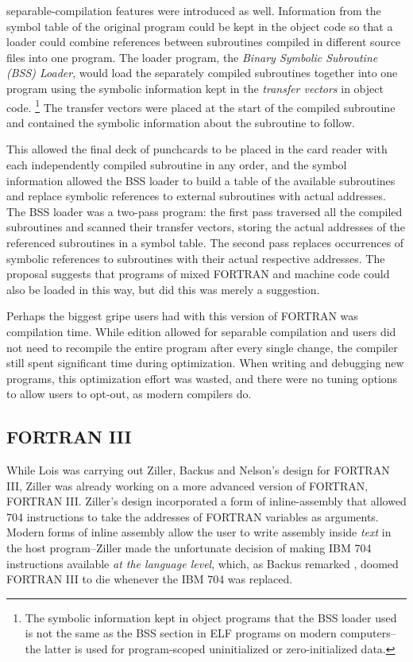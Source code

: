 \Gls{separable-compilation} features were introduced as well.
Information from the symbol table of the original program could be kept
in the object code so that a loader could combine references between subroutines
compiled in different source files into one program.
The loader program, the \textit{Binary Symbolic Subroutine (BSS) Loader},
would load the separately compiled subroutines together into one program using
the symbolic information kept in the \textit{transfer vectors} in object code.
\footnote{The symbolic information kept in object programs that the BSS loader
	used is not the same as the BSS section in ELF programs on modern computers--
	the latter is used for program-scoped uninitialized or zero-initialized data.}
The transfer vectors were placed at the start of the compiled subroutine and
contained the symbolic information about the subroutine to follow.

This allowed the final deck of punchcards to be placed in the card reader
with each independently compiled subroutine in any order, and the symbol information
allowed the BSS loader to build a table of the available subroutines and replace
symbolic references to external subroutines with actual addresses.
The BSS loader was a two-pass program: the first pass traversed all the compiled
subroutines and scanned their transfer vectors, storing the actual addresses of
the referenced subroutines in a symbol table.
The second pass replaces occurrences of symbolic references to subroutines
with their actual respective addresses.
The proposal suggests that programs of mixed FORTRAN and machine code could
also be loaded in this way, but did this was merely a suggestion.

Perhaps the biggest gripe users had with this version of FORTRAN was
compilation time.
While edition allowed for separable compilation and users did not need to recompile
the entire program after every single change, the compiler still spent significant time
during optimization.
When writing and debugging new programs, this optimization effort was wasted, and
there were no tuning options to allow users to opt-out, as modern compilers do.

\subsection{FORTRAN III}

While Lois was carrying out Ziller, Backus and Nelson's design for FORTRAN III,
Ziller was already working on a more advanced version of FORTRAN, FORTRAN III.
Ziller's design incorporated a form of \gls{inline-assembly} that allowed
704 instructions to take the addresses of FORTRAN variables as arguments.
Modern forms of inline assembly allow the user to write assembly inside \textit{text}
in the host program--Ziller made the unfortunate decision of making IBM 704
instructions available \textit{at the language level}, which, as Backus remarked
\cite{hopl_backus_history_of_fortran}, doomed FORTRAN III to die whenever the IBM 704
was replaced.

